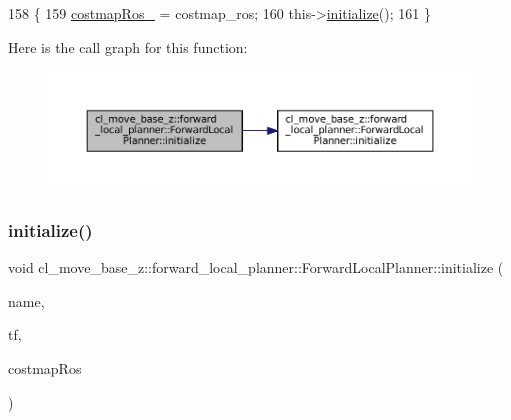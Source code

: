 \begin{DoxyCode}
158 \{
159     \hyperlink{classcl__move__base__z_1_1forward__local__planner_1_1ForwardLocalPlanner_a37791fea67ce92c6e38e3727311e533b}{costmapRos\_} = costmap\_ros;
160     this->\hyperlink{classcl__move__base__z_1_1forward__local__planner_1_1ForwardLocalPlanner_ab455a974d5dcffda7e9772023840c7e6}{initialize}();
161 \}
\end{DoxyCode}
Here is the call graph for this function\+:
\nopagebreak
\begin{figure}[H]
\begin{center}
\leavevmode
\includegraphics[width=350pt]{classcl__move__base__z_1_1forward__local__planner_1_1ForwardLocalPlanner_ac2a9a9eb71d7f2db81da407581fa545e_cgraph}
\end{center}
\end{figure}
\mbox{\label{classcl__move__base__z_1_1forward__local__planner_1_1ForwardLocalPlanner_a5ef0a220f6ff05f7cd9128c6b5d4d165}} 
\subsubsection{\texorpdfstring{initialize()}{initialize()}\hspace{0.1cm}{\footnotesize\ttfamily [2/3]}}
{\footnotesize\ttfamily void cl\+\_\+move\+\_\+base\+\_\+z\+::forward\+\_\+local\+\_\+planner\+::\+Forward\+Local\+Planner\+::initialize (\begin{DoxyParamCaption}\item[{std\+::string}]{name,  }\item[{tf2\+\_\+ros\+::\+Buffer $\ast$}]{tf,  }\item[{costmap\+\_\+2d\+::\+Costmap2\+D\+R\+OS $\ast$}]{costmap\+Ros }\end{DoxyParamCaption})}



